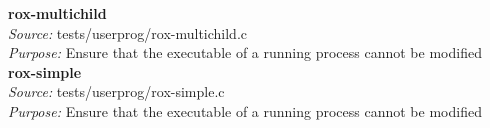     \textbf{rox-multichild}\\
    \textit{Source:} tests/userprog/rox-multichild.c\\
    \textit{Purpose:} Ensure that the executable of a running process cannot be modified\\
    
    \textbf{rox-simple}\\
    \textit{Source:} tests/userprog/rox-simple.c\\
    \textit{Purpose:} Ensure that the executable of a running process cannot be modified\\    
  
